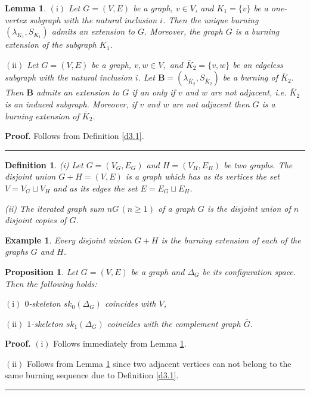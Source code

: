 \documentclass[a4paper, 11pt]{article}
\newtheorem{proposition}[theorem]{Proposition}
\newtheorem{lemma}[theorem]{Lemma}
\newtheorem{definition}[theorem]{Definition}
\newtheorem{example}[theorem]{Example}
\newenvironment{proof}[1][Proof]{\textbf{#1.} }{\ \rule{0.5em}{0.5em}}
\begin{document}
\begin{lemma}\label{l4.8}  $\mathrm{(i)}$ Let $G=(V, E)$ be a graph, $v\in V$, and $K_1=\{v\}$ be a one-vertex subgraph with  the  natural inclusion $ i$. 
Then the unique burning $(\lambda_{K_1}, S_{K_1})$ admits an extension to $G$.
Moreover, the graph $G$ is a burning extension of the subgraph $K_1$. 

$\mathrm{(ii)}$ Let $G=(V, E)$ be a graph, $v,w\in V,$ and $\overline K_2=\{v, w\}$ be an edgeless subgraph with  the  natural inclusion $ i$. Let  
$\mathbf B=(\lambda_{\overline K_2}, S_{\overline K_2})$ be a 
 burning of $\overline K_2$. Then  $\mathbf B$ admits an extension to $G$ if an only if $v$ and $w$ are not adjacent, i.e. ${\overline K_2}$ is an induced subgraph. Moreover,    if $v$ and $w$ are not adjacent then    $G$ is a burning extension of $\overline K_2$. 
\end{lemma} 
\begin{proof} Follows from Definition \ref{d3.1}. 
\end{proof}


\begin{definition}\label{d4.9} \rm  (i) Let $G=(V_G, E_G)$ and $H=(V_H, E_H)$ be two graphs. The \emph{disjoint union} $G+H=(V,E)$  is a graph which  has as its vertices the set  $V=V_G\sqcup V_H$ and as its edges the set $E=E_G\sqcup E_H$.  

(ii) The \emph{iterated graph sum} $nG\, (n\geq 1)$ of a graph $G$  is the disjoint union of $n$ disjoint copies of $G$.
\end{definition} 

\begin{example}\label{e4.10} \rm 
Every  disjoint uinion $G+H$ is the burning extension of each of the graphs $G$ and $H$. 
\end{example}

\begin{proposition}\label{p4.11}  Let $G=(V, E)$ be a graph and $\Delta_G$ be its configuration space. Then the following holds:

 $\mathrm{(i)}$
 $0$-skeleton  $sk_0(\Delta_G)$  coincides with $V$, 
 
 $\mathrm{(ii)}$
 $1$-skeleton  $sk_1(\Delta_G)$  coincides with the complement graph $\overline G$.%
\end{proposition} 
\begin{proof} $\mathrm{(i)}$ Follows immediately from Lemma \ref{l4.8}.

 $\mathrm{(ii)}$  Follows from Lemma \ref{l4.8}  since two adjacent vertices can not belong to the same burning sequence due to Definition \ref{d3.1}.
\end{proof}
\end{document}
